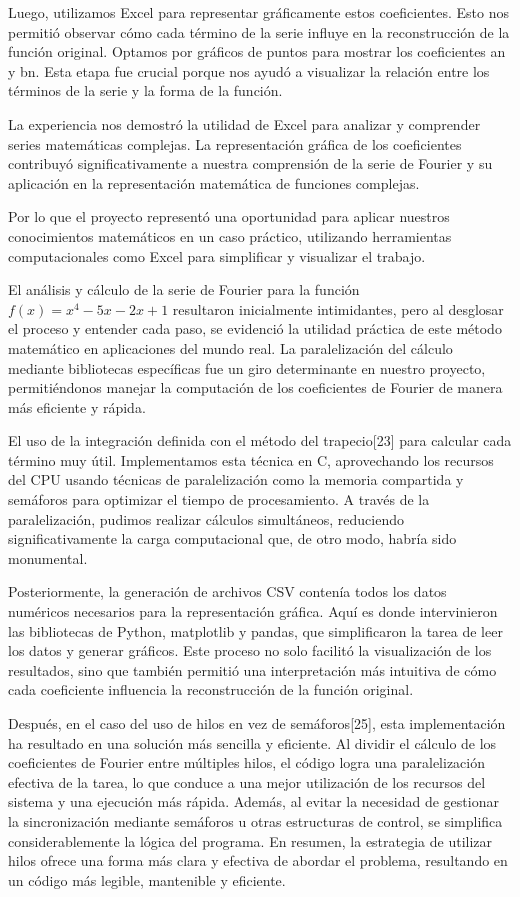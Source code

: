 Luego, utilizamos Excel para representar gráficamente estos coeficientes. Esto nos permitió observar cómo cada término de la serie influye en la reconstrucción de la función original. Optamos por gráficos de puntos para mostrar los coeficientes an y bn\hspace{0pt}. Esta etapa fue crucial porque nos ayudó a visualizar la relación entre los términos de la serie y la forma de la función.

La experiencia nos demostró la utilidad de Excel para analizar y comprender series matemáticas complejas. La representación gráfica de los coeficientes contribuyó significativamente a nuestra comprensión de la serie de Fourier y su aplicación en la representación matemática de funciones complejas.

Por lo que el proyecto representó una oportunidad para aplicar nuestros conocimientos matemáticos en un caso práctico, utilizando herramientas computacionales como Excel para simplificar y visualizar el trabajo.

El análisis y cálculo de la serie de Fourier para la función \(f(x)=x^4-5x-2x+1\) resultaron inicialmente intimidantes, pero al desglosar el proceso y entender cada paso, se evidenció la utilidad práctica de este método matemático en aplicaciones del mundo real. La paralelización del cálculo mediante bibliotecas específicas fue un giro determinante en nuestro proyecto, permitiéndonos manejar la computación de los coeficientes de Fourier de manera más eficiente y rápida.

El uso de la integración definida con el método del trapecio{[}23{]} para calcular cada término muy útil. Implementamos esta técnica en C, aprovechando los recursos del CPU usando técnicas de paralelización como la memoria compartida y semáforos para optimizar el tiempo de procesamiento. A través de la paralelización, pudimos realizar cálculos simultáneos, reduciendo significativamente la carga computacional que, de otro modo, habría sido monumental.

Posteriormente, la generación de archivos CSV contenía todos los datos numéricos necesarios para la representación gráfica. Aquí es donde intervinieron las bibliotecas de Python, matplotlib y pandas, que simplificaron la tarea de leer los datos y generar gráficos. Este proceso no solo facilitó la visualización de los resultados, sino que también permitió una interpretación más intuitiva de cómo cada coeficiente influencia la reconstrucción de la función original.

Después, en el caso del uso de hilos en vez de semáforos{[}25{]}, esta implementación ha resultado en una solución más sencilla y eficiente. Al dividir el cálculo de los coeficientes de Fourier entre múltiples hilos, el código logra una paralelización efectiva de la tarea, lo que conduce a una mejor utilización de los recursos del sistema y una ejecución más rápida. Además, al evitar la necesidad de gestionar la sincronización mediante semáforos u otras estructuras de control, se simplifica considerablemente la lógica del programa. En resumen, la estrategia de utilizar hilos ofrece una forma más clara y efectiva de abordar el problema, resultando en un código más legible, mantenible y eficiente.

